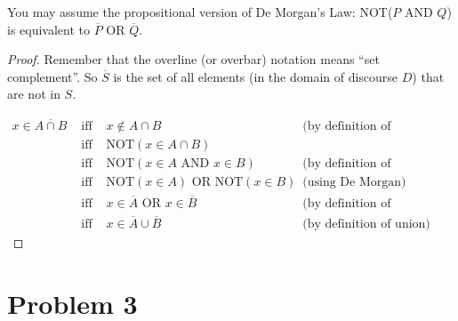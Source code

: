 \documentclass[14pt]{extarticle}
\begin{document}
You may assume the propositional version of De Morgan’s Law: NOT($P$ AND $Q$) is equivalent to $\overline{P}$ OR $\overline{Q}$.
\begin{proof}
Remember that the overline (or overbar) notation means ``set complement''. So $\overline{S}$ is the set of all elements (in the domain of discourse $D$) that are not in $S$.

$$
\begin{array}{cccc}
x \in \overline{A \cap B} & \text{ iff } &  x \notin A \cap B & \text{(by definition of complement)} \\
 & \text{ iff } & \text{NOT}(x \in A \cap B) & \\
 & \text{ iff } & \text{NOT}(x \in A \text{ AND } x \in B) & \text{(by definition of intersection)}\\
 & \text{ iff } & \text{NOT}(x \in A) \text{ OR NOT}(x \in B) & \text{(using De Morgan)}\\
 & \text{ iff } & x \in \overline{A} \text{ OR }x \in\overline{B} & \text{(by definition of complement)}\\
 & \text{ iff } & x \in \overline{A} \cup \overline{B} & \text{(by definition of union)} 
\end{array}
$$
\end{proof}

\section{Problem 3}
\end{document}
